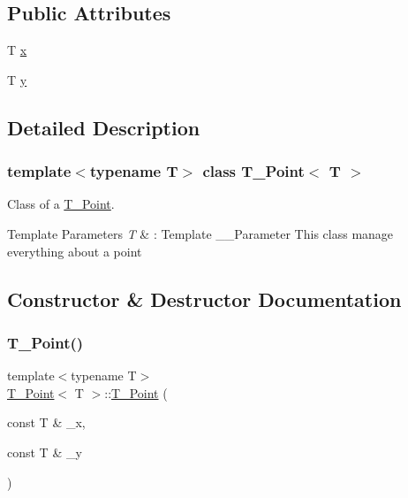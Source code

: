 \subsection*{Public Attributes}
\begin{DoxyCompactItemize}
\item 
T \hyperlink{classPoint_a401d07562afaf0079121218025e66b76}{x}
\item 
T \hyperlink{classPoint_a65146418a33ebb2cd9acb85cade60ac9}{y}
\end{DoxyCompactItemize}


\subsection{Detailed Description}
\subsubsection*{template$<$typename T$>$\newline
class T_Point$<$ T $>$}

Class of a \hyperlink{classPoint}{T_Point}.


\begin{DoxyTemplParams}{Template Parameters}
{\em T} & \+: Template __Parameter This class manage everything about a point \\
\hline
\end{DoxyTemplParams}


\subsection{Constructor \& Destructor Documentation}
\mbox{\label{classPoint_a0a84c3f55d42ec6e142de0251ea255ad}} 
\subsubsection{\texorpdfstring{T_Point()}{T_Point()}}
{\footnotesize\ttfamily template$<$typename T$>$ \\
\hyperlink{classPoint}{T_Point}$<$ T $>$\+::\hyperlink{classPoint}{T_Point} (\begin{DoxyParamCaption}\item[{const T \&}]{\+\_\+x,  }\item[{const T \&}]{\+\_\+y }\end{DoxyParamCaption})\hspace{0.3cm}{\ttfamily [inline]}}



